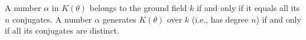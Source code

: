 A number $\alpha$ in $K(\theta)$ belongs to the ground field $k$ if and only if it equals all its $n$ conjugates. A number $\alpha$ generates $K(\theta)$ over $k$ (i.e., has degree $n$) if and only if all its conjugates are distinct.
